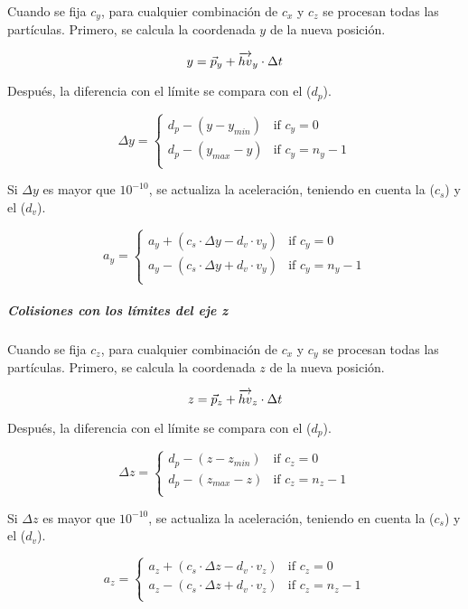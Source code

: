 Cuando se fija $c_y$, para cualquier combinación de $c_x$ y $c_z$ se
procesan todas las partículas. Primero, se calcula la coordenada $y$ de la 
nueva posición.

\[
y = \vec{p}_y + \overrightarrow{hv}_y \cdot \Delta t \\
\]

Después, la diferencia con el límite se compara con el  ($d_p$).

\[
\Delta y = 
\begin{cases}
d_p - (y - y_{min}) & \text{if } c_y = 0\\
d_p - (y_{max} - y) & \text{if } c_y = n_y -1\\
\end{cases}
\]

Si $\Delta y$ es mayor que $10^{-10}$, se actualiza la aceleración,
teniendo en cuenta la  ($c_s$) y el
 ($d_v$).

\[
a_y = 
\begin{cases}
  a_y + ( c_s \cdot \Delta y - d_v \cdot v_y ) & \text{if  } c_y = 0\\
  a_y - ( c_s \cdot \Delta y + d_v \cdot v_y ) & \text{if  } c_y = n_y-1\\
\end{cases}
\]

\subparagraph{Colisiones con los límites del eje z}

Cuando se fija $c_z$, para cualquier combinación de $c_x$ y $c_y$ se
procesan todas las partículas. Primero, se calcula la coordenada $z$ de la 
nueva posición.

\[
z = \vec{p}_z + \overrightarrow{hv}_z \cdot \Delta t \\
\]

Después, la diferencia con el límite se compara con el  ($d_p$).

\[
\Delta z = 
\begin{cases}
d_p - (z - z_{min}) & \text{if } c_z = 0\\
d_p - (z_{max} - z) & \text{if } c_z = n_z -1\\
\end{cases}
\]

Si $\Delta z$ es mayor que $10^{-10}$, se actualiza la aceleración,
teniendo en cuenta la  ($c_s$) y el
 ($d_v$).

\[
a_z = 
\begin{cases}
  a_z + ( c_s \cdot \Delta z - d_v \cdot v_z ) & \text{if  } c_z = 0\\
  a_z - ( c_s \cdot \Delta z + d_v \cdot v_z ) & \text{if  } c_z = n_z-1\\
\end{cases}
\]
